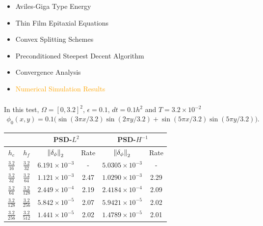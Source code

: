 \documentclass[amstex]{beamer}
\newcommand{\wuhao}{\fontsize{10.5pt}{\baselineskip}\selectfont}    %
\begin{document}
\begin{CJK*}{GBK}{kai}
\begin{frame}
\end{frame}
\begin{frame}
	\begin{itemize}%
		\item \textcolor{orange!10}{Aviles-Giga Type Energy}
		\item \textcolor{orange!10}{Thin Film Epitaxial Equations}
		\item \textcolor{orange!10}{Convex Splitting Schemes}
		\item \textcolor{orange!10}{Preconditioned Steepest Decent Algorithm}
		\item \textcolor{orange!10}{Convergence Analysis}
		\item \textcolor{orange}{Numerical Simulation Results}
	\end{itemize}
\end{frame}
 \begin{frame}
 	\frametitle{\wuhao{\bf Numerical Results: Convergence Rate}}
 	
 	In this test, $\Omega=[0, 3.2]^2$, $\epsilon=0.1$, $dt=0.1h^2$ and $T=3.2\times 10^{-2}$ {\color{blue}\cite{feng2015multigrid}}%
 	\scriptsize\begin{eqnarray*}
 		\phi_0(x,y) = 0.1\big(\sin({3\pi x}/{3.2})\sin({2\pi y}/{3.2})+\sin({5\pi x}/{3.2})\sin({5\pi y}/{3.2})\big). 
 	\end{eqnarray*} 
 	\begin{table}[!htb]
 		\begin{center}
 			\begin{tabular}{cccccc}
 				\hline &&\multicolumn{2}{c}{PSD-$L^2$}&\multicolumn{2}{c}{PSD-$H^{-1}$}\\
 				\hline $h_c$&$h_{f}$&$\left\|\delta_\phi\right\|_{2}$ & Rate& $\left\|\delta_\phi\right\|_{2}$ & Rate\\
 				\hline $\frac{3.2}{16}$&$\frac{3.2}{32}$& $6.191\times 10^{-3}$&- &$ 5.0305\times 10^{-3}$&-
 				\\$\frac{3.2}{32}$&$\frac{3.2}{64}$& $1.121\times 10^{-3}$ &2.47&$ 1.0290\times 10^{-3}$ &2.29
 				\\ $\frac{3.2}{64}$ &$\frac{3.2}{128}$& $2.449\times 10^{-4}$&2.19 &$2.4184\times 10^{-4}$&2.09
 				\\ $\frac{3.2}{128}$ & $\frac{3.2}{256}$ &$5.842\times 10^{-5}$&2.07 &$5.9421\times 10^{-5}$&2.02
 				\\ $\frac{3.2}{256}$ & $\frac{3.2}{512}$&$1.441\times 10^{-5}$&2.02&$1.4789\times 10^{-5}$&2.01 \\
 				\hline
 			\end{tabular}
 		\end{center}
 	\end{table}
 	

\end{frame}
\end{CJK*}
\end{document}
